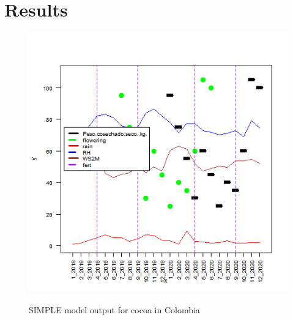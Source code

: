 \documentclass[gene,journal,article,submit,moreauthors,pdftex]{Definitions/mdpi}
\begin{document}
\section{Results}
\begin{figure}[h]
	\centering
	\caption{\footnotesize {SIMPLE model output for cocoa in Colombia }} 
	\includegraphics[scale=0.4]{images/averageS.png}\\
	\label{fig:weather}
\end{figure}
\end{document}
